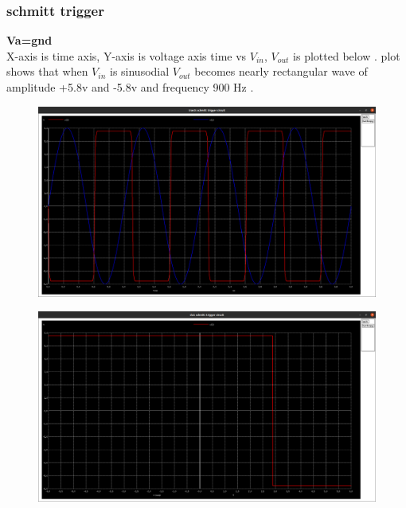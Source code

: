 \documentclass[12pt]{article}
\begin{document}
\subsubsection{schmitt trigger}
\textbf{Va=gnd\\}
X-axis is time axis, Y-axis is voltage axis time vs \(V_{in}\), \(V_{out}\) is plotted below . plot shows that when \(V_{in}\) is sinusodial \(V_{out}\) becomes nearly rectangular wave of amplitude +5.8v and -5.8v and frequency 900 Hz .\\
\begin{figure}[h!]
\centering
\includegraphics[scale = 0.2]{q1_gnd_sin.png}
\end{figure}
\newpage
\begin{figure}[h!]
\centering
\includegraphics[scale = 0.2]{q1_gnd_dc.png}
\end{figure}
\newpage
\end{document}
